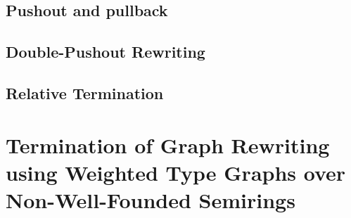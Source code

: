 \documentclass{report}
\begin{document}
\section{Pushout and pullback}  

\section{Double-Pushout Rewriting}
 
\section{Relative Termination}



\chapter{Termination of Graph Rewriting
using Weighted Type Graphs
over Non-Well-Founded Semirings} 
\label{chap:nwf_type_graph}



% 
 
\end{document}

